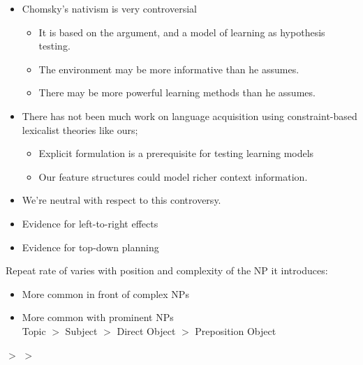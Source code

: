 \documentclass[a4paper,landscape,headrule,footrule]{foils}
\begin{document}

\begin{itemize}
\item Chomsky’s nativism is very controversial
  \begin{itemize}
  \item It is based on the  argument, and a 
    model of learning as hypothesis testing.  
  \item The environment may be more informative than he assumes.
  \item There may be more powerful learning methods than he 
    assumes.
  \end{itemize}
\item There has not been much work on language acquisition 
  using constraint-based lexicalist theories like ours;  
  \begin{itemize}
  \item Explicit formulation is a prerequisite for testing learning models
  \item Our feature structures could model richer context information.
  \end{itemize}
\item We’re neutral with respect to this controversy.
\end{itemize}



\begin{itemize}
\item Evidence for left-to-right effects
\item Evidence for top-down planning
\end{itemize}


Repeat rate of  varies with position and complexity of the NP it
introduces:


\begin{itemize}
\item More common in front of complex NPs
\item More common with prominent NPs
  \\ Topic $>$ Subject $>$ Direct Object $>$ Preposition Object
\end{itemize}

\begin{exe}
  \ex {}
  \ex $>$ 
  \ex $>$ 
\end{exe}
\end{document}
